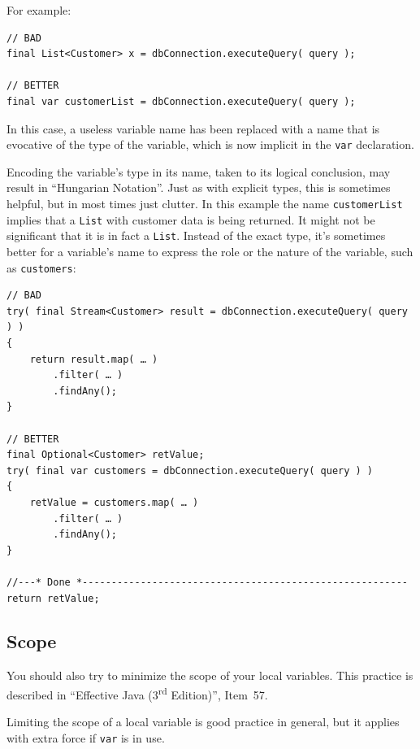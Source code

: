 \documentclass[11pt,a4paper, titlepage, parskip=half, headsepline, footsepline, cleardoublepage=current, headheight=1cm]{scrbook}
\begin{document}
For example:
\begin{lstlisting}
// BAD
final List<Customer> x = dbConnection.executeQuery( query );

// BETTER
final var customerList = dbConnection.executeQuery( query );
\end{lstlisting}

In this case, a useless variable name has been replaced with a name that is evocative of the type of the variable, which is now implicit in the \lstinline|var| declaration.

Encoding the variable's type in its name, taken to its logical conclusion, may result in “Hungarian Notation”\autocite{WIKIPEDIA:Hungarian_notation,Jack:HungarianNotation}. Just as with explicit types, this is sometimes helpful, but in most times just clutter. In this example the name \lstinline|customerList| implies that a \lstinline|List| with customer data is being returned. It might not be significant that it is in fact a \lstinline|List|. Instead of the exact type, it’s sometimes better for a variable’s name to express the role or the nature of the variable, such as \lstinline|customers|:

\begin{lstlisting}
// BAD
try( final Stream<Customer> result = dbConnection.executeQuery( query ) ) 
{
    return result.map( … )
        .filter( … )
        .findAny();
}

// BETTER
final Optional<Customer> retValue;
try( final var customers = dbConnection.executeQuery( query ) ) 
{
    retValue = customers.map( … )
        .filter( … )
        .findAny();
}

//---* Done *--------------------------------------------------------
return retValue;
\end{lstlisting}


\subsection{Scope}\label{sec:varScope}
You should also try to minimize the scope of your local variables. This practice is described in “Effective Java (3\textsuperscript{rd} Edition)”\autocite{Bloch:EffectiveJava}, Item~57.

Limiting the scope of a local variable is good practice in general, but it applies with extra force if \lstinline|var| is in use.
\end{document}
